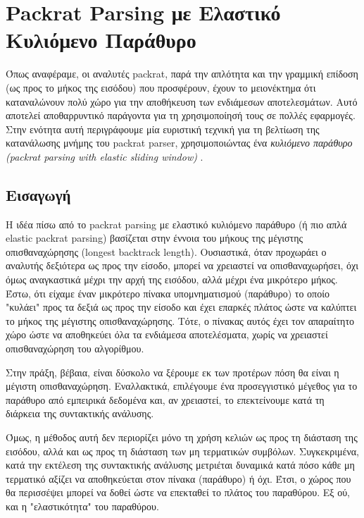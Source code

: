 \chapter{ Packrat Parsing με Ελαστικό Κυλιόμενο Παράθυρο}
\label{ch:elastic}

Όπως αναφέραμε, οι αναλυτές packrat, παρά την απλότητα και την γραμμική επίδοση (ως προς το μήκος της εισόδου) που προσφέρουν, έχουν το μειονέκτημα ότι καταναλώνουν πολύ χώρο για την αποθήκευση των ενδιάμεσων αποτελεσμάτων.
Αυτό αποτελεί αποθαρρυντικό παράγοντα για τη χρησιμοποίησή τους σε πολλές εφαρμογές.
Στην ενότητα αυτή περιγράφουμε μία ευριστική τεχνική για τη βελτίωση της κατανάλωσης μνήμης του packrat parser, χρησιμοποιώντας ένα \textit{κυλιόμενο παράθυρο (packrat parsing with elastic sliding window)} \cite{Kuramitsu2015a}.

\section{Εισαγωγή}

Η ιδέα πίσω από το packrat parsing με ελαστικό κυλιόμενο παράθυρο (ή πιο απλά elastic packrat parsing) βασίζεται στην έννοια του μήκους της μέγιστης οπισθαναχώρησης (longest backtrack length).
Ουσιαστικά, όταν προχωράει ο αναλυτής δεξιότερα ως προς την είσοδο, μπορεί να χρειαστεί να οπισθαναχωρήσει, όχι όμως αναγκαστικά μέχρι την αρχή της εισόδου, αλλά μέχρι ένα μικρότερο μήκος.
Έστω, ότι είχαμε έναν μικρότερο πίνακα υπομνηματισμού (παράθυρο) το οποίο "κυλάει" προς τα δεξιά ως προς την είσοδο και έχει επαρκές πλάτος ώστε να καλύπτει το μήκος της μέγιστης οπισθαναχώρησης. 
Τότε, ο πίνακας αυτός έχει τον απαραίτητο χώρο ώστε να αποθηκεύει όλα τα ενδιάμεσα αποτελέσματα, χωρίς να χρειαστεί οπισθαναχώρηση του αλγορίθμου.

Στην πράξη, βέβαια, είναι δύσκολο να ξέρουμε εκ των προτέρων πόση θα είναι η μέγιστη οπισθαναχώρηση.
Εναλλακτικά, επιλέγουμε ένα προσεγγιστικό μέγεθος για το παράθυρο από εμπειρικά δεδομένα και, αν χρειαστεί, το επεκτείνουμε κατά τη διάρκεια της συντακτικής ανάλυσης.

Όμως, η μέθοδος αυτή δεν περιορίζει μόνο τη χρήση κελιών ως προς τη διάσταση της εισόδου, αλλά και ως προς τη διάσταση των μη τερματικών συμβόλων.
Συγκεκριμένα, κατά την εκτέλεση της συντακτικής ανάλυσης μετριέται δυναμικά κατά πόσο κάθε μη τερματικό αξίζει να αποθηκεύεται στον πίνακα (παράθυρο) ή όχι.
Έτσι, ο χώρος που θα περισσέψει μπορεί να δοθεί ώστε να επεκταθεί το πλάτος του παραθύρου.
Εξ ού, και η "ελαστικότητα" του παραθύρου.

